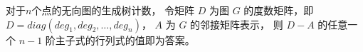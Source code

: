 对于$n$个点的无向图的生成树计数，
令矩阵 $D$ 为图 $G$ 的度数矩阵，即 $ D = diag(deg_1,deg_2, \ldots , deg_n) $， $A$ 为 $G$ 的邻接矩阵表示，
则 $ D - A $ 的任意一个 $n-1$ 阶主子式的行列式的值即为答案。
